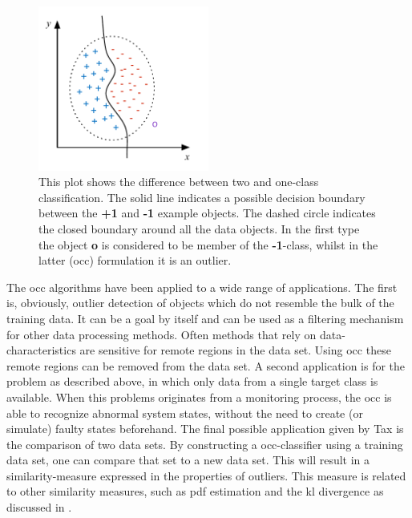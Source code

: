 \begin{figure}
  \centering
    \includegraphics[width=0.5\textwidth,keepaspectratio]{./Figures/chapter3/two-vs-one-classification.pdf}
  \caption[Difference between two and one-class classification]{This plot shows the difference between two and one-class classification. The solid line indicates a possible decision boundary between the \textbf{+1} and \textbf{-1} example objects. The dashed circle indicates the closed boundary around all the data objects. In the first type the object \textbf{o} is considered to be member of the \textbf{-1}-class, whilst in the latter (\gls{occ}) formulation it is an outlier.}
  \label{fig:two-vs-one-classification}
\end{figure}

The \gls{occ} algorithms have been applied to a wide range of applications.
The first is, obviously, outlier detection of objects which do not resemble the bulk of the training data.
It can be a goal by itself and can be used as a filtering mechanism for other data processing methods.
Often methods that rely on data-characteristics are sensitive for remote regions in the data set.
Using \gls{occ} these remote regions can be removed from the data set.
A second application is for the problem as described above, in which only data from a single target class is available.
When this problems originates from \eg a monitoring process, the \gls{occ} is able to recognize abnormal system states, without the need to create (or simulate) faulty states beforehand.
The final possible application given by Tax \cite{tax2001one} is the comparison of two data sets.
By constructing a \gls{occ}-classifier using a training data set, one can compare that set to a new data set.
This will result in a similarity-measure expressed in the properties of outliers.
This measure is related to other similarity measures, such as \gls{pdf} estimation and the \gls{kl} divergence as discussed in .

